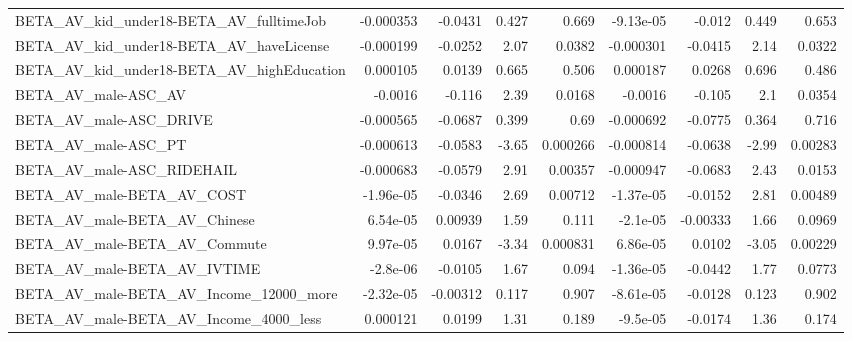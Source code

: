 \begin{tabular}{lrrrrrrrr}
BETA\_AV\_kid\_under18-BETA\_AV\_fulltimeJob            &   -0.000353 &      -0.0431 &    0.427 &    0.669 &  -9.13e-05 &      -0.012 &        0.449 &         0.653 \\
BETA\_AV\_kid\_under18-BETA\_AV\_haveLicense            &   -0.000199 &      -0.0252 &     2.07 &   0.0382 &  -0.000301 &     -0.0415 &         2.14 &        0.0322 \\
BETA\_AV\_kid\_under18-BETA\_AV\_highEducation          &    0.000105 &       0.0139 &    0.665 &    0.506 &   0.000187 &      0.0268 &        0.696 &         0.486 \\
BETA\_AV\_male-ASC\_AV                                &     -0.0016 &       -0.116 &     2.39 &   0.0168 &    -0.0016 &      -0.105 &          2.1 &        0.0354 \\
BETA\_AV\_male-ASC\_DRIVE                             &   -0.000565 &      -0.0687 &    0.399 &     0.69 &  -0.000692 &     -0.0775 &        0.364 &         0.716 \\
BETA\_AV\_male-ASC\_PT                                &   -0.000613 &      -0.0583 &    -3.65 & 0.000266 &  -0.000814 &     -0.0638 &        -2.99 &       0.00283 \\
BETA\_AV\_male-ASC\_RIDEHAIL                          &   -0.000683 &      -0.0579 &     2.91 &  0.00357 &  -0.000947 &     -0.0683 &         2.43 &        0.0153 \\
BETA\_AV\_male-BETA\_AV\_COST                          &   -1.96e-05 &      -0.0346 &     2.69 &  0.00712 &  -1.37e-05 &     -0.0152 &         2.81 &       0.00489 \\
BETA\_AV\_male-BETA\_AV\_Chinese                       &    6.54e-05 &      0.00939 &     1.59 &    0.111 &   -2.1e-05 &    -0.00333 &         1.66 &        0.0969 \\
BETA\_AV\_male-BETA\_AV\_Commute                       &    9.97e-05 &       0.0167 &    -3.34 & 0.000831 &   6.86e-05 &      0.0102 &        -3.05 &       0.00229 \\
BETA\_AV\_male-BETA\_AV\_IVTIME                        &    -2.8e-06 &      -0.0105 &     1.67 &    0.094 &  -1.36e-05 &     -0.0442 &         1.77 &        0.0773 \\
BETA\_AV\_male-BETA\_AV\_Income\_12000\_more             &   -2.32e-05 &     -0.00312 &    0.117 &    0.907 &  -8.61e-05 &     -0.0128 &        0.123 &         0.902 \\
BETA\_AV\_male-BETA\_AV\_Income\_4000\_less              &    0.000121 &       0.0199 &     1.31 &    0.189 &   -9.5e-05 &     -0.0174 &         1.36 &         0.174 \\

\end{tabular}
